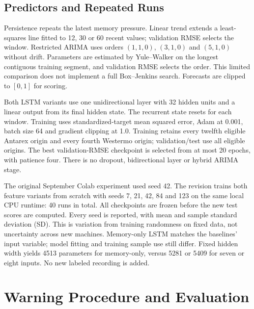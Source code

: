 \documentclass{llncs}
\begin{document}
\subsection{Predictors and Repeated Runs}
Persistence repeats the latest memory pressure. Linear trend extends a least-squares line fitted to 12, 30 or 60 recent values; validation RMSE selects the window. Restricted ARIMA uses orders $(1,1,0)$, $(3,1,0)$ and $(5,1,0)$ without drift. Parameters are estimated by Yule--Walker on the longest contiguous training segment, and validation RMSE selects the order. This limited comparison does not implement a full Box--Jenkins search. Forecasts are clipped to $[0,1]$ for scoring.

Both LSTM variants use one unidirectional layer with 32 hidden units and a linear output from its final hidden state. The recurrent state resets for each window. Training uses standardized-target mean squared error, Adam at 0.001, batch size 64 and gradient clipping at 1.0. Training retains every twelfth eligible Antarex origin and every fourth Westermo origin; validation/test use all eligible origins. The best validation-RMSE checkpoint is selected from at most 20 epochs, with patience four. There is no dropout, bidirectional layer or hybrid ARIMA stage.

The original September Colab experiment used seed 42. The revision trains both feature variants from scratch with seeds 7, 21, 42, 84 and 123 on the same local CPU runtime: 40 runs in total. All checkpoints are frozen before the new test scores are computed. Every seed is reported, with mean and sample standard deviation (SD). This is variation from training randomness on fixed data, not uncertainty across new machines. Memory-only LSTM matches the baselines' input variable; model fitting and training sample use still differ. Fixed hidden width yields 4513 parameters for memory-only, versus 5281 or 5409 for seven or eight inputs. No new labeled recording is added.

\section{Warning Procedure and Evaluation}
\end{document}

